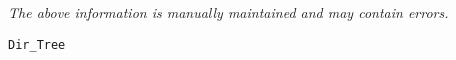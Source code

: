 \label{pkg:dir\_tree}

{\tiny \it The above information is manually maintained and may contain errors.}
\begin{verbatim}
Dir_Tree
\end{verbatim}
